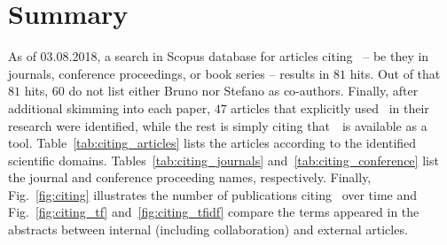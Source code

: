 \documentclass[11pt]{article}
\begin{document}
\Header
\Footer 
\FrontPage

\section*{Summary}

As of 03.08.2018, a search in Scopus database for articles citing \uqlab~-- be they in journals, conference proceedings, or book series -- results in $81$ hits.
Out of that $81$ hits, $60$ do not list either Bruno nor Stefano as co-authors.
Finally, after additional skimming into each paper, $47$ articles that explicitly used \uqlab~in their research were identified, while the rest is simply citing that~\uqlab~is available as a tool.
Table~\ref{tab:citing_articles} lists the articles according to the identified scientific domains.
Tables~\ref{tab:citing_journals} and~\ref{tab:citing_conference} list the journal and conference proceeding names, respectively.
Finally, Fig.~\ref{fig:citing} illustrates the number of publications citing \uqlab~over time
and Fig.~\ref{fig:citing_tf} and~\ref{fig:citing_tfidf} compare the terms appeared in the abstracts between internal (including collaboration) and external articles.
\end{document}
